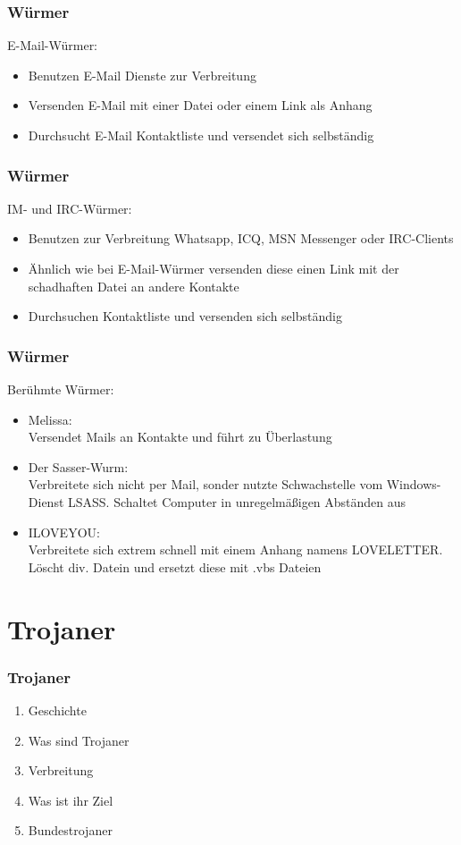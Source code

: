 \documentclass{beamer}
\begin{document}
\begin{frame}
	\frametitle{Würmer}
		\begin{block}{E-Mail-Würmer:}
			\begin{itemize}
				\item Benutzen E-Mail Dienste zur Verbreitung
				\item Versenden E-Mail mit einer Datei oder einem Link als Anhang
				\item Durchsucht E-Mail Kontaktliste und versendet sich selbständig
			\end{itemize}
		\end{block}
\end{frame}

\begin{frame}
	\frametitle{Würmer}
		\begin{block}{IM- und IRC-Würmer:}
			\begin{itemize}
				\item Benutzen zur Verbreitung Whatsapp, ICQ, MSN Messenger oder IRC-Clients
				\item Ähnlich wie bei E-Mail-Würmer versenden diese einen Link mit der schadhaften Datei an andere Kontakte
				\item Durchsuchen Kontaktliste und versenden sich selbständig
			\end{itemize}
		\end{block}
\end{frame}

\begin{frame}
	\frametitle{Würmer}
		\begin{block}{Berühmte Würmer:}
			\begin{itemize}
				\item Melissa:\\
				Versendet Mails an Kontakte und führt zu Überlastung
				\item Der Sasser-Wurm:\\
				Verbreitete sich nicht per Mail, sonder nutzte Schwachstelle vom Windows-Dienst LSASS. Schaltet Computer in unregelmäßigen Abständen aus
				\item ILOVEYOU:\\
				Verbreitete sich extrem schnell mit einem Anhang namens LOVELETTER. Löscht div. Datein und ersetzt diese mit .vbs Dateien
			\end{itemize}
		\end{block}
\end{frame}


\section{Trojaner}
\begin{frame}
	\frametitle{Trojaner}
	\begin{enumerate}
		\item Geschichte 
		\item Was sind Trojaner
		\item Verbreitung
		\item Was ist ihr Ziel
		\item Bundestrojaner 
	\end{enumerate}
\end{frame}
\end{document}

